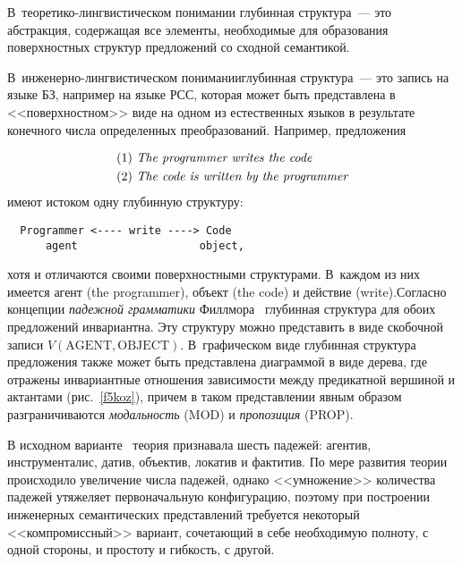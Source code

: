 \begin{multicols}{2}
В~тео\-ре\-ти\-ко-линг\-ви\-сти\-че\-ском 
понимании глубинная структура~--- это абстракция, содержащая все 
элементы, необходимые для образования поверхностных структур 
предложений со сходной семантикой. 

     В~ин\-же\-нер\-но-линг\-ви\-сти\-че\-ском понимании\linebreak глубинная 
структура~--- это запись на языке БЗ, например на языке РСС, 
которая может быть представлена в <<поверхностном>> виде на одном из 
естественных языков в результате конечного числа определенных 
преобразований. Например, предложения

\noindent
\begin{align*}    
(1)\ &\mbox{\textit{The programmer writes the code}}\\
(2)\ &\mbox{\textit{The code is written by the programmer}}
\end{align*}
имеют истоком одну глубинную структуру:

\medskip

\noindent
     \begin{verbatim}
  Programmer <---- write ----> Code
      agent                   object,
\end{verbatim}

\medskip

\noindent
хотя и отличаются своими поверхностными структурами. В~каждом из них 
имеется агент (the programmer), объект (the code) и действие (write).\linebreak Согласно 
концепции \textit{падежной грамматики} Филлмора~\cite{5koz} глубинная 
структура для обоих предложений инвариантна. Эту структуру можно 
представить в виде скобочной записи $V(\mathrm{AGENT}, \mathrm{OBJECT})$. В~графическом 
виде глубинная структура предложения также может быть представлена 
диаграммой в виде дерева, где отражены инвариантные отношения 
зависимости между предикатной вершиной и актантами (рис.~\ref{f5koz}), 
причем в таком представлении явным образом разграничиваются 
\textit{модальность} (MOD) и \textit{пропозиция} (PROP).
     

     В исходном варианте~\cite{5koz} теория признавала шесть падежей: 
агентив, инструменталис, датив, объектив, локатив и фактитив. По мере 
развития теории~\cite{8koz} происходило увеличение числа падежей, однако 
<<умножение>> количества падежей утяжеляет первоначальную 
конфигурацию, поэтому при построении инженерных семантических 
представлений требуется некоторый <<компромиссный>> вариант, 
сочетающий в себе необходимую полноту, с одной стороны, и простоту и 
гибкость, с другой.


\end{multicols}

